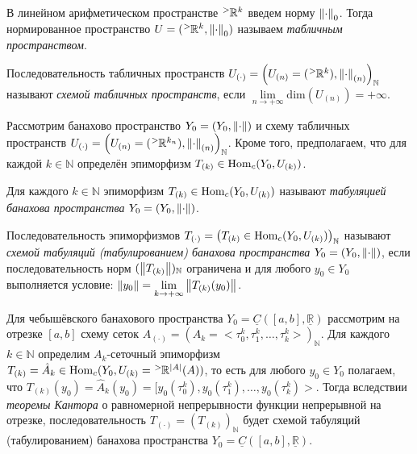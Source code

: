 
\begin{definition}
	В линейном арифметическом пространстве $\tensor[^{>}]{\mathbb{R}}{^k}$ введем норму $\norm{\cdot}_{0}$. Тогда нормированное пространство $U = (\tensor[^{>}]{\mathbb{R}}{^k}, \norm{\cdot}_{0})$ называем \textit{табличным пространством}. 
	
	Последовательность табличных пространств $U_{(\cdot)} = \left(U_{(n)} = (\tensor[^{>}]{\mathbb{R}}{^k}), \norm{\cdot}_{(n)}\right)_{\mathbb{N}}$ называют \textit{схемой табличных пространств}, если $\lim\limits_{n \to +\infty}{\mathrm{dim}(U_{(n)})} = +\infty$.
\end{definition}

Рассмотрим банахово пространство $Y_0 = (Y_0, \norm{\cdot})$ и схему табличных пространств $U_{(\cdot)} = \left(U_{(n)} = (\tensor[^{>}]{\mathbb{R}}{^{k_n}}), \norm{\cdot}_{(n)}\right)_{\mathbb{N}}$. Кроме того, предполагаем, что для каждой $k \in \mathbb{N}$ определён эпиморфизм $T_{(k)} \in \mathrm{Hom}_c(Y_0, U_{(k)})$.

\begin{definition}
	Для каждого $k \in \mathbb{N}$ эпиморфизм $T_{(k)} \in \mathrm{Hom}_c(Y_0, U_{(k)})$ называют \textit{табуляцией банахова пространства} $Y_0 = (Y_0, \norm{\cdot})$.
	
	Последовательность эпиморфизмов $T_{(\cdot)} = \left(T_{(k)} \in \mathrm{Hom}_c(Y_0, U_{(k)})\right)_{\mathbb{N}}$ называют \textit{схемой табуляций (табулированием) банахова пространства} $Y_0 = (Y_0, \norm{\cdot})$, если последовательность норм $(\norm{T_{(k)}})_{\mathbb{N}}$ ограничена и для любого $y_0 \in Y_0$ выполняется условие: $\norm{y_0} = \lim\limits_{k \to +\infty}{\norm{T_{(k)}(y_0)}}$.
\end{definition}

\begin{utv}
	Для чебышёвского банахового пространства $Y_0 = \underline{C}([a, b], \underline{\mathbb{R}})$ рассмотрим на отрезке $[a, b]$ схему сеток $A_{(\cdot)} = (A_{k} = \big<\tau_0^k, \tau_1^k, \dotsc, \tau_k^k\big>)_{\mathbb{N}}$. Для каждого $k \in \mathbb{N}$ определим $A_k$-сеточный эпиморфизм $T_{(k)} = \hat{A}_k \in \Hom_c(Y_0, U_{(k)} = \tensor[^{>}]{\mathbb{R}}{^{\abs{A}}}(A))$, то есть для любого $y_0 \in Y_0$ полагаем, что $T_{(k)}(y_0) = \hat{A}_k(y_0) = [y_0(\tau_0^k), y_0(\tau_1^k), \dotsc, y_0(\tau_k^k)\big>$. Тогда вследствии \textit{теоремы Кантора} о равномерной непрерывности функции непрерывной на отрезке, последовательность $T_{(\cdot)} = (T_{(k)})_{\mathbb{N}}$ будет схемой табуляций (табулированием) банахова пространства $Y_0 = \underline{C}([a, b], \underline{\mathbb{R}})$. 
\end{utv}